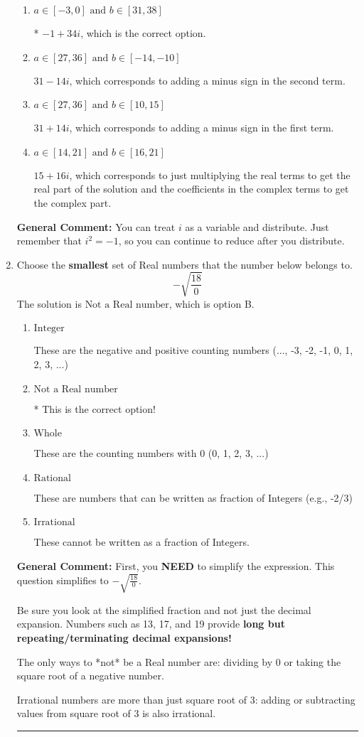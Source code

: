 \documentclass{extbook}[14pt]
\newcommand{\litem}[1]{\item #1

\rule{\textwidth}{0.4pt}}
\begin{document}
\begin{enumerate}
{\begin{enumerate}[label=\Alph*.]
 $-1 - 34 i$, which corresponds to adding a minus sign in both terms.
\item \( a \in [-3, 0] \text{ and } b \in [31, 38] \)

* $-1 + 34 i$, which is the correct option.
\item \( a \in [27, 36] \text{ and } b \in [-14, -10] \)

 $31 - 14 i$, which corresponds to adding a minus sign in the second term.
\item \( a \in [27, 36] \text{ and } b \in [10, 15] \)

 $31 + 14 i$, which corresponds to adding a minus sign in the first term.
\item \( a \in [14, 21] \text{ and } b \in [16, 21] \)

 $15 + 16 i$, which corresponds to just multiplying the real terms to get the real part of the solution and the coefficients in the complex terms to get the complex part.
\end{enumerate}

\textbf{General Comment:} You can treat $i$ as a variable and distribute. Just remember that $i^2=-1$, so you can continue to reduce after you distribute.
}
\litem{
Choose the \textbf{smallest} set of Real numbers that the number below belongs to.
\[ -\sqrt{\frac{18}{0}} \]The solution is \( \text{Not a Real number} \), which is option B.\begin{enumerate}[label=\Alph*.]
\item \( \text{Integer} \)

These are the negative and positive counting numbers (..., -3, -2, -1, 0, 1, 2, 3, ...)
\item \( \text{Not a Real number} \)

* This is the correct option!
\item \( \text{Whole} \)

These are the counting numbers with 0 (0, 1, 2, 3, ...)
\item \( \text{Rational} \)

These are numbers that can be written as fraction of Integers (e.g., -2/3)
\item \( \text{Irrational} \)

These cannot be written as a fraction of Integers.
\end{enumerate}

\textbf{General Comment:} First, you \textbf{NEED} to simplify the expression. This question simplifies to $-\sqrt{\frac{18}{0}}$. 
 
 Be sure you look at the simplified fraction and not just the decimal expansion. Numbers such as 13, 17, and 19 provide \textbf{long but repeating/terminating decimal expansions!} 
 
 The only ways to *not* be a Real number are: dividing by 0 or taking the square root of a negative number. 
 
 Irrational numbers are more than just square root of 3: adding or subtracting values from square root of 3 is also irrational.
}
\end{enumerate}
\end{document}

